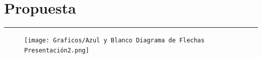 \chapter{Propuesta}
\hrule \bigskip \vspace*{1cm}




\begin{figure}[h]
    \centering
    \texttt{[image: Graficos/Azul y Blanco Diagrama de Flechas Presentación2.png]}
    \label{fig:enter-label}
\end{figure}



